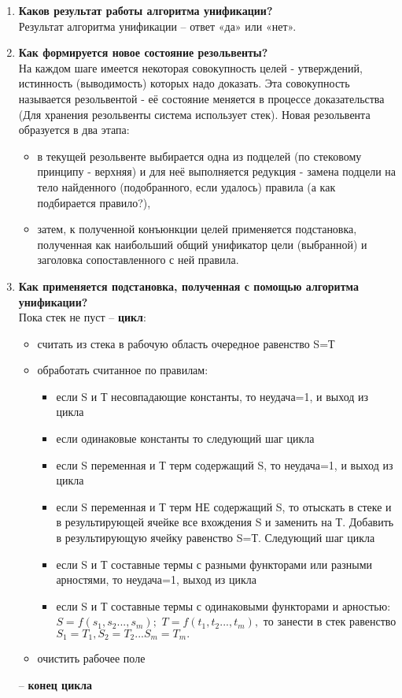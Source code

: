 \begin{enumerate}
	\item \textbf{Каков  результат работы алгоритма унификации?}\\
Результат алгоритма унификации – ответ «да» или «нет». 

    \item \textbf{Как формируется новое состояние резольвенты?}\\
   	На каждом шаге имеется некоторая совокупность целей - утверждений, истинность (выводимость) которых надо доказать. Эта совокупность называется резольвентой - её состояние меняется в процессе доказательства (Для хранения резольвенты система использует стек). 
   	Новая резольвента образуется в два этапа:
   	\begin{itemize}
   		\item в текущей резольвенте выбирается одна из подцелей (по стековому принципу - верхняя) и для неё выполняется редукция - замена подцели на тело найденного (подобранного, если удалось) правила (а как подбирается правило?),
   		\item затем, к полученной конъюнкции целей применяется подстановка, полученная как наибольший общий унификатор цели (выбранной) и заголовка сопоставленного с ней правила.
   	\end{itemize}	
   
   	\item \textbf{\textbf{Как применяется подстановка, полученная с помощью алгоритма унификации?}}\\
   
   Пока стек не пуст – \textbf{цикл}:
   \begin{itemize}
   	\item	считать из стека в рабочую область очередное равенство S=Т
   	\item	обработать считанное по правилам:
   	\begin{itemize}
   		\item	если S и Т несовпадающие константы,			то неудача=1, и выход из цикла
   		\item	если одинаковые константы					то следующий шаг цикла
   		\item	если S переменная и Т терм содержащий S,		то неудача=1, и выход из цикла
   		\item	если S переменная и Т терм НЕ содержащий S,	то отыскать в стеке и в результирующей ячейке все вхождения S и заменить на Т. Добавить в результирующую ячейку равенство S=Т.  Следующий шаг цикла
   		\item	если S и Т составные термы с разными функторами или разными арностями, то неудача=1, выход из цикла
   		\item	если S и Т составные термы с одинаковыми функторами и арностью: $S=f(s_1,s_2 ...,s_m);$   $T=f(t_1,t_2 ...,t_m),$  то занести в стек равенство $S_1=T_1, S_2=T_2 ... S_m=T_m.$
   	\end{itemize}
   	\item	очистить рабочее поле
   \end{itemize}
   –  \textbf{конец цикла}
   

\end{enumerate}
